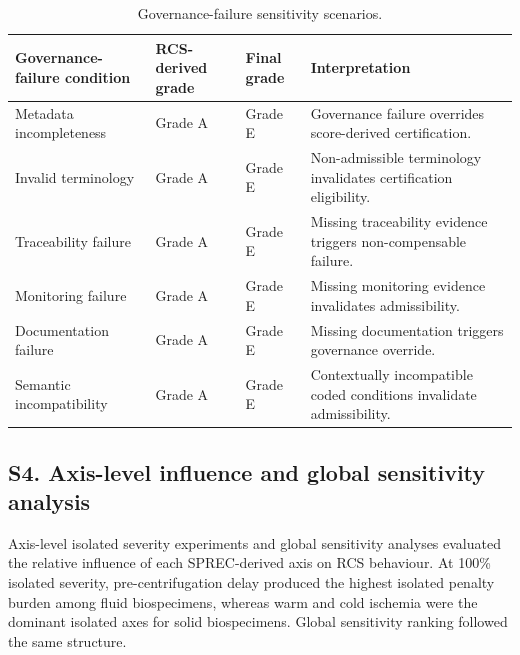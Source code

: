\documentclass[preprint,12pt]{elsarticle}
\begin{document}
\begin{table}[!htbp]
\caption{Governance-failure sensitivity scenarios.}
\label{tab:governance_sensitivity_details}
\centering
\footnotesize
\setlength{\tabcolsep}{4pt}
\renewcommand{\arraystretch}{1.10}

\begin{tabular}{@{}L{3.7cm}C{2.4cm}C{1.8cm}L{5.9cm}@{}}
\toprule
\textbf{Governance-failure condition}
& \textbf{RCS-derived grade}
& \textbf{Final grade}
& \textbf{Interpretation} \\
\midrule

Metadata incompleteness
& Grade A
& Grade E
& Governance failure overrides score-derived certification. \\

Invalid terminology
& Grade A
& Grade E
& Non-admissible terminology invalidates certification eligibility. \\

Traceability failure
& Grade A
& Grade E
& Missing traceability evidence triggers non-compensable failure. \\

Monitoring failure
& Grade A
& Grade E
& Missing monitoring evidence invalidates admissibility. \\

Documentation failure
& Grade A
& Grade E
& Missing documentation triggers governance override. \\

Semantic incompatibility
& Grade A
& Grade E
& Contextually incompatible coded conditions invalidate admissibility. \\

\bottomrule
\end{tabular}
\end{table}

\FloatBarrier

\subsection*{S4. Axis-level influence and global sensitivity analysis}

Axis-level isolated severity experiments and global sensitivity analyses evaluated the relative influence of each SPREC-derived axis on RCS behaviour. At 100\% isolated severity, pre-centrifugation delay produced the highest isolated penalty burden among fluid biospecimens, whereas warm and cold ischemia were the dominant isolated axes for solid biospecimens. Global sensitivity ranking followed the same structure.
\end{document}
